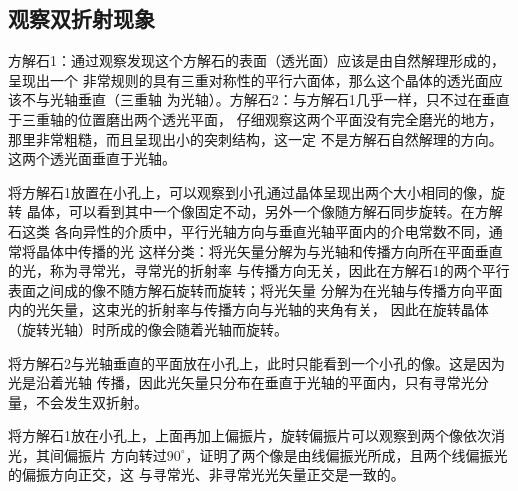 \documentclass[a4paper]{ctexart}
\begin{document}
    \subsection{观察双折射现象}
    \par 
    方解石1：通过观察发现这个方解石的表面（透光面）应该是由自然解理形成的，呈现出一个
    非常规则的具有三重对称性的平行六面体，那么这个晶体的透光面应该不与光轴垂直（三重轴
    为光轴）。方解石2：与方解石1几乎一样，只不过在垂直于三重轴的位置磨出两个透光平面，
    仔细观察这两个平面没有完全磨光的地方，那里非常粗糙，而且呈现出小的突刺结构，这一定
    不是方解石自然解理的方向。这两个透光面垂直于光轴。
    \par 
    将方解石1放置在小孔上，可以观察到小孔通过晶体呈现出两个大小相同的像，旋转
    晶体，可以看到其中一个像固定不动，另外一个像随方解石同步旋转。在方解石这类
    各向异性的介质中，平行光轴方向与垂直光轴平面内的介电常数不同，通常将晶体中传播的光
    这样分类：将光矢量分解为与光轴和传播方向所在平面垂直的光，称为寻常光，寻常光的折射率
    与传播方向无关，因此在方解石1的两个平行表面之间成的像不随方解石旋转而旋转；将光矢量
    分解为在光轴与传播方向平面内的光矢量，这束光的折射率与传播方向与光轴的夹角有关，
    因此在旋转晶体（旋转光轴）时所成的像会随着光轴而旋转。
    \par 
    将方解石2与光轴垂直的平面放在小孔上，此时只能看到一个小孔的像。这是因为光是沿着光轴
    传播，因此光矢量只分布在垂直于光轴的平面内，只有寻常光分量，不会发生双折射。
    \par 
    将方解石1放在小孔上，上面再加上偏振片，旋转偏振片可以观察到两个像依次消光，其间偏振片
    方向转过$90^\circ$，证明了两个像是由线偏振光所成，且两个线偏振光的偏振方向正交，这
    与寻常光、非寻常光光矢量正交是一致的。
\end{document}
